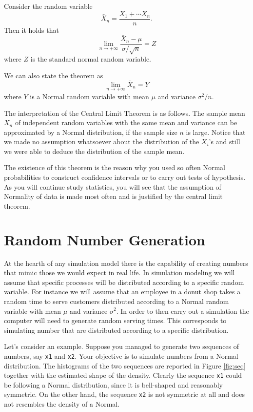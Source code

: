 \documentclass[
]{book}
\begin{document}
Consider the random variable
\[
\bar{X}_n= \frac{X_1+\cdots X_n}{n}.
\]
Then it holds that
\[
\lim_{n\rightarrow + \infty} \frac{\bar{X}_n-\mu}{\sigma/\sqrt{n}} = Z
\]
where \(Z\) is the standard normal random variable.

We can also state the theorem as
\[
\lim_{n\rightarrow + \infty} \bar{X}_n = Y
\]
where \(Y\) is a Normal random variable with mean \(\mu\) and variance \(\sigma^2/n\).

The interpretation of the Central Limit Theorem is as follows. The sample mean \(\bar{X}_n\) of independent random variables with the same mean and variance can be approximated by a Normal distribution, if the sample size \(n\) is large. Notice that we made no assumption whatsoever about the distribution of the \(X_i\)'s and still we were able to deduce the distribution of the sample mean.

The existence of this theorem is the reason why you used so often Normal probabilities to construct confidence intervals or to carry out tests of hypothesis. As you will continue study statistics, you will see that the assumption of Normality of data is made most often and is justified by the central limit theorem.

\hypertarget{random-number-generation}{%
\chapter{Random Number Generation}\label{random-number-generation}}

At the hearth of any simulation model there is the capability of creating numbers that mimic those we would expect in real life. In simulation modeling we will assume that specific processes will be distributed according to a specific random variable. For instance we will assume that an employee in a donut shop takes a random time to serve customers distributed according to a Normal random variable with mean \(\mu\) and variance \(\sigma^2\). In order to then carry out a simulation the computer will need to generate random serving times. This corresponds to simulating number that are distributed according to a specific distribution.

Let's consider an example. Suppose you managed to generate two sequences of numbers, say \texttt{x1} and \texttt{x2}. Your objective is to simulate numbers from a Normal distribution. The histograms of the two sequences are reported in Figure \ref{fig:seq} together with the estimated shape of the density. Clearly the sequence \texttt{x1} could be following a Normal distribution, since it is bell-shaped and reasonably symmetric. On the other hand, the sequence \texttt{x2} is not symmetric at all and does not resembles the density of a Normal.
\end{document}
